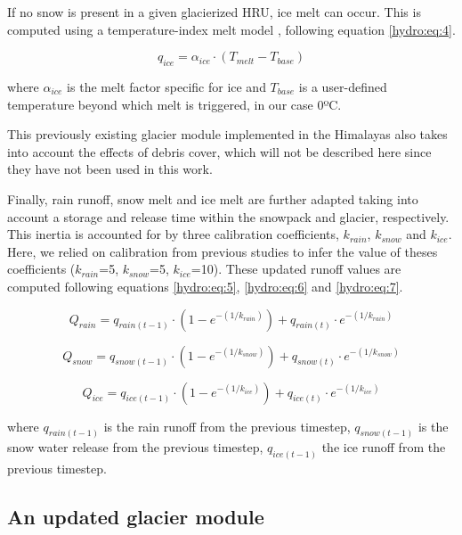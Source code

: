 If no snow is present in a given glacierized HRU, ice melt can occur. This is computed using a temperature-index melt model \citep{hock_temperature_2003}, following equation \ref{hydro:eq:4}.

\begin{equation} \label{hydro:eq:4}
q_{ice} = \alpha_{ice } \cdot(T_{melt} - T_{base})
\end{equation} 

where $\alpha_{ice}$ is the melt factor specific for ice and $T_{base}$ is a user-defined temperature beyond which melt is triggered, in our case 0ºC. 

This previously existing glacier module implemented in the Himalayas also takes into account the effects of debris cover, which will not be described here since they have not been used in this work. 

Finally, rain runoff, snow melt and ice melt are further adapted taking into account a storage and release time within the snowpack and glacier, respectively. This inertia is accounted for by three calibration coefficients, $k_{rain}$, $k_{snow}$ and $k_{ice}$. Here, we relied on calibration from previous studies to infer the value of theses coefficients ($k_{rain}$=5, $k_{snow}$=5, $k_{ice}$=10). These updated runoff values are computed following equations \ref{hydro:eq:5}, \ref{hydro:eq:6} and \ref{hydro:eq:7}.

\begin{equation} \label{hydro:eq:5}
Q_{rain} = q_{rain(t-1)}\cdot (1-e^{-(1/k_{rain})}) + q_{rain(t)} \cdot e^{-(1/k_{rain})}
\end{equation} 

\begin{equation} \label{hydro:eq:5}
Q_{snow} = q_{snow(t-1)}\cdot (1-e^{-(1/k_{snow})}) + q_{snow(t)} \cdot e^{-(1/k_{snow})}
\end{equation} 

\begin{equation} \label{hydro:eq:6}
Q_{ice} = q_{ice(t-1)} \cdot (1-e^{-(1/k_{ice})}) + q_{ice(t)} \cdot e^{-(1/k_{ice})}
\end{equation} 

where $q_{rain(t-1)}$ is the rain runoff from the previous timestep, $q_{snow(t-1)}$ is the snow water release from the previous timestep, $q_{ice(t-1)}$ the ice runoff from the previous timestep.

\subsection{An updated glacier module}

